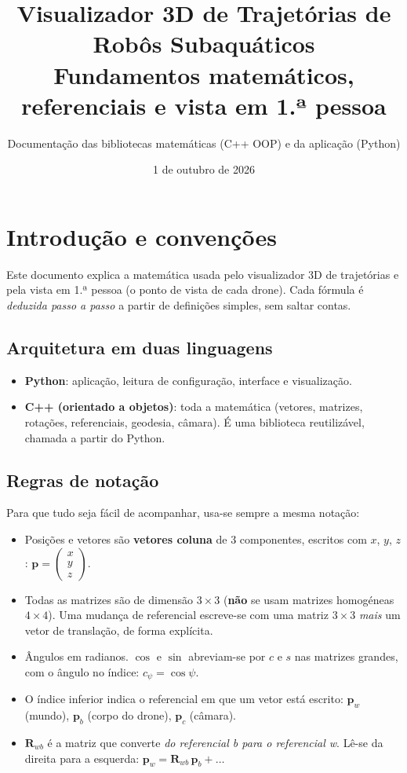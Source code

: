 \documentclass[11pt,a4paper]{article}
\title{\textbf{Visualizador 3D de Trajetórias de Robôs Subaquáticos}\\[0.3em]
\large Fundamentos matemáticos, referenciais e vista em 1.ª pessoa}
\author{Documentação das bibliotecas matemáticas (C++ OOP) e da aplicação (Python)}
\date{1 de outubro de 2026}
\newcommand{\vv}[1]{\mathbf{#1}}              %
\newcommand{\col}[3]{\begin{pmatrix}#1\\#2\\#3\end{pmatrix}}
\newcommand{\cs}{\cos}
\newcommand{\sn}{\sin}
\newcommand{\Rot}{\mathbf{R}}
\theoremstyle{definition}
\begin{document}
\maketitle
\tableofcontents
\newpage

\section{Introdução e convenções}
Este documento explica a matemática usada pelo visualizador 3D de trajetórias e pela vista em 1.ª pessoa (o ponto de vista de cada drone). Cada fórmula é \emph{deduzida passo a passo} a partir de definições simples, sem saltar contas.

\subsection{Arquitetura em duas linguagens}
\begin{itemize}[nosep]
  \item \textbf{Python}: aplicação, leitura de configuração, interface e visualização.
  \item \textbf{C++ (orientado a objetos)}: toda a matemática (vetores, matrizes, rotações, referenciais, geodesia, câmara). É uma biblioteca reutilizável, chamada a partir do Python.
\end{itemize}

\subsection{Regras de notação}
Para que tudo seja fácil de acompanhar, usa-se sempre a mesma notação:
\begin{itemize}[nosep]
  \item Posições e vetores são \textbf{vetores coluna} de 3 componentes, escritos com $x$, $y$, $z$:
  $\vv{p}=\col{x}{y}{z}$.
  \item Todas as matrizes são de dimensão $3\times 3$ (\textbf{não} se usam matrizes homogéneas $4\times 4$). Uma mudança de referencial escreve-se com uma matriz $3\times3$ \emph{mais} um vetor de translação, de forma explícita.
  \item Ângulos em radianos. $\cs$ e $\sn$ abreviam-se por $c$ e $s$ nas matrizes grandes, com o ângulo no índice: $c_\psi=\cos\psi$.
  \item O índice inferior indica o referencial em que um vetor está escrito: $\vv{p}_w$ (mundo), $\vv{p}_b$ (corpo do drone), $\vv{p}_c$ (câmara).
  \item $\Rot_{wb}$ é a matriz que converte \emph{do referencial b para o referencial w}. Lê-se da direita para a esquerda: $\vv{p}_w=\Rot_{wb}\,\vv{p}_b+\ldots$
\end{itemize}
\end{document}
